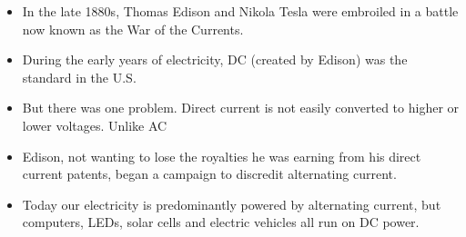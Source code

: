 \documentclass[preview]{standalone}
\begin{document}
\centering \begin{itemize}\item In the late 1880s, Thomas Edison and Nikola Tesla were embroiled in a battle now known as the War of the Currents.\item During the early years of electricity, DC (created by Edison) was the standard in the U.S.\item But there was one problem. Direct current is not easily converted to higher or lower voltages. Unlike AC\item Edison, not wanting to lose the royalties he was earning from his direct current patents, began a campaign to discredit alternating current.\item Today our electricity is predominantly powered by alternating current, but computers, LEDs, solar cells and electric vehicles all run on DC power. \end{itemize}
\end{document}
